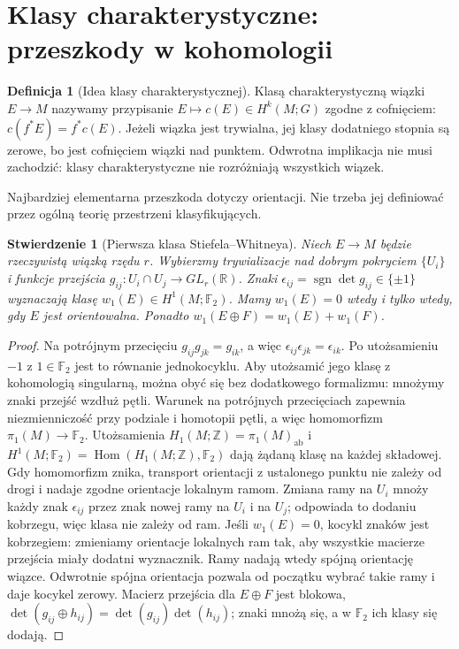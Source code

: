 \documentclass[11pt,a4paper,oneside]{report}
\newcommand{\R}{\mathbb{R}}
\newcommand{\Z}{\mathbb{Z}}
\theoremstyle{plain}
\newtheorem{stwierdzenie}[twierdzenie]{Stwierdzenie}
\theoremstyle{definition}
\newtheorem{definicja}[twierdzenie]{Definicja}
\theoremstyle{remark}
\begin{document}
\section{Klasy charakterystyczne: przeszkody w kohomologii}
\label{sec:klasy-char-16}

\begin{definicja}[Idea klasy charakterystycznej]
Klasą charakterystyczną
wiązki $E\to M$ nazywamy
przypisanie $E\mapsto c(E)
\in H^k(M;G)$ zgodne
z cofnięciem:
$c(f^*E)=f^*c(E)$.
Jeżeli wiązka jest trywialna,
jej klasy dodatniego stopnia
są zerowe, bo jest cofnięciem
wiązki nad punktem.
Odwrotna implikacja
nie musi zachodzić:
klasy charakterystyczne
nie rozróżniają wszystkich
wiązek.
\end{definicja}

Najbardziej elementarna
przeszkoda dotyczy
orientacji. Nie trzeba
jej definiować przez
ogólną teorię przestrzeni
klasyfikujących.

\begin{stwierdzenie}[Pierwsza klasa Stiefela--Whitneya]
\label{prop:w1-orientacja-16}
Niech $E\to M$ będzie
rzeczywistą wiązką
rzędu $r$. Wybierzmy
trywializacje nad dobrym
pokryciem $\{U_i\}$ i
funkcje przejścia
$g_{ij}:U_i\cap U_j\to GL_r(\R)$.
Znaki
$\epsilon_{ij}=\operatorname{sgn}
\det g_{ij}\in\{\pm1\}$
wyznaczają klasę
$w_1(E)\in H^1(M;\mathbb F_2)$.
Mamy $w_1(E)=0$
wtedy i tylko wtedy,
gdy $E$ jest orientowalna.
Ponadto
$w_1(E\oplus F)=w_1(E)+w_1(F)$.
\end{stwierdzenie}
\begin{proof}
Na potrójnym przecięciu
$g_{ij}g_{jk}=g_{ik}$,
a więc
$\epsilon_{ij}\epsilon_{jk}
=\epsilon_{ik}$.
Po utożsamieniu $-1$
z $1\in\mathbb F_2$
jest to równanie jednokocyklu. Aby utożsamić jego
klasę z kohomologią singularną, można obyć się
bez dodatkowego formalizmu: mnożymy znaki przejść
wzdłuż pętli. Warunek na potrójnych przecięciach
zapewnia niezmienniczość przy podziale i homotopii
pętli, a więc homomorfizm $\pi_1(M)\to\mathbb F_2$.
Utożsamienia $H_1(M;\Z)=\pi_1(M)_{\mathrm{ab}}$
i $H^1(M;\mathbb F_2)=\operatorname{Hom}(H_1(M;\Z),\mathbb F_2)$
dają żądaną klasę na każdej składowej. Gdy homomorfizm
znika, transport orientacji z ustalonego punktu nie
zależy od drogi i nadaje zgodne orientacje lokalnym ramom.
Zmiana
ramy na $U_i$ mnoży
każdy znak $\epsilon_{ij}$
przez znak nowej ramy
na $U_i$ i na $U_j$;
odpowiada to dodaniu
kobrzegu, więc klasa
nie zależy od ram.
Jeśli $w_1(E)=0$,
kocykl znaków jest
kobrzegiem: zmieniamy
orientacje lokalnych
ram tak, aby wszystkie
macierze przejścia
miały dodatni wyznacznik.
Ramy nadają wtedy
spójną orientację
wiązce. Odwrotnie
spójna orientacja
pozwala od początku
wybrać takie ramy
i daje kocykel zerowy.
Macierz przejścia
dla $E\oplus F$
jest blokowa,
$\det(g_{ij}\oplus h_{ij})
=\det(g_{ij})\det(h_{ij})$;
znaki mnożą się, a
w $\mathbb F_2$
ich klasy się dodają.
\end{proof}
\end{document}
